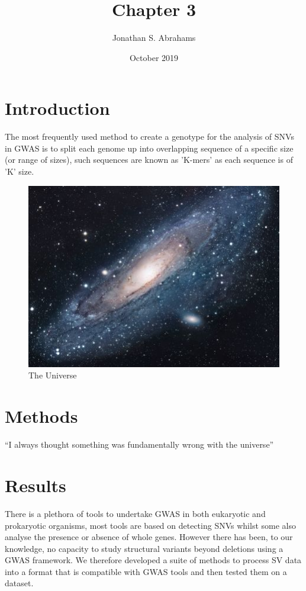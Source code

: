\documentclass{article}
\title{Chapter 3}
\author{Jonathan S. Abrahams }
\date{October 2019}
\begin{document}
\maketitle

\section{Introduction}
The most frequently used method to create a genotype for the analysis of SNVs in GWAS is to split each genome up into overlapping sequence of a specific size (or range of sizes), such sequences are known as 'K-mers' as each sequence is of 'K' size.

\begin{figure}[h!]
\centering
\includegraphics[scale=1.7]{universe}
\caption{The Universe}
\label{fig:universe}
\end{figure}

\section{Methods}
``I always thought something was fundamentally wrong with the universe'' \citep{adams1995hitchhiker}
\section{Results}

\newcommand{\quickwordcount}[1]{%
  \immediate\write18{texcount -1 -sum -merge -q #1.tex output.bbl > #1-words.sum }%
   words%
}
There is a plethora of tools to undertake GWAS in both eukaryotic and prokaryotic organisms, most tools are based on detecting SNVs whilst some also analyse the presence or absence of whole genes. However there has been, to our knowledge, no capacity to study structural variants beyond deletions using a GWAS framework. We therefore developed a suite of methods to process SV data into a format that is compatible with GWAS tools and then tested them on a dataset.
\end{document}
